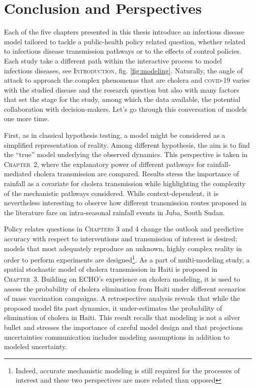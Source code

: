 \chapter*{Conclusion and Perspectives}
Each of the five chapters presented in this thesis introduce an infectious disease model tailored to tackle a public-health policy related question, whether related to infectious disease transmission pathways or to the effects of control policies. Each study take a different path within the interactive process to model infectious diseases, see \textsc{Introduction}, fig. \ref{fig:modeling}. Naturally, the angle of attack to approach the complex phenomenas that are cholera and \textsc{covid}-19 varies with the studied disease and the research question but also with many factors that set the stage for the study, among which \eg the data available, the potential collaboration with decision-makers. Let's go through this conversation of models one more time.

First, as in classical hypothesis testing, a model might be considered as a simplified representation of reality. Among different hypothesis, the aim is to find the ``true'' model underlying the observed dynamics. This perspective is taken in \textsc{Chapter~2}, where the explanatory power of different pathways for rainfall-mediated cholera transmission are compared\cite{Rinaldo:Reassessment20102011:2012, Eisenberg:ExaminingRainfallCholera:2013}. Results stress the importance of rainfall as a covariate for cholera transmission while highlighting the complexity of the mechanistic pathways considered. While context-dependent, it is nevertheless interesting to observe how different transmission routes proposed in the literature fare on intra-seasonal rainfall events in Juba, South Sudan.

Policy relates questions in \textsc{Chapters 3} and 4 change the outlook and predictive accuracy with respect to interventions and transmission of interest is desired; models that most adequately reproduce an unknown, highly complex reality in order to perform experiments are designed\footnote{Indeed, accurate mechanistic modeling is still required for the processes of interest and these two perspectives are more related than opposed}. As a part of multi-modeling study\cite{Lee:AchievingCoordinatedNational:2020}, a spatial stochastic model of cholera transmission in Haiti is proposed in \textsc{Chapter~3}. Building on ECHO's experience on cholera modeling\cite{Rinaldo:Reassessment20102011:2012}, it is used to assess the probability of cholera elimination from Haiti under different scenarios of mass vaccination campaigns. A retrospective analysis reveals that while the proposed model fits past dynamics, it under-estimates the probability of elimination of cholera in Haiti. This result recalls that modeling is not a silver bullet and stresses the importance of careful model design and that projections uncertainties communication includes modeling assumptions in addition to modeled uncertainty.

